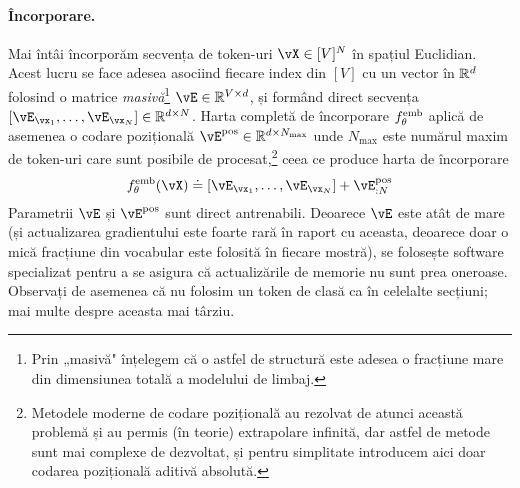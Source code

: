 \documentclass[../../book-main_ro.tex]{subfiles}
\begin{document}
\paragraph{Încorporare.} Mai întâi încorporăm secvența de token-uri \(\vX \in [V]^{N}\) în spațiul Euclidian. Acest lucru se face adesea asociind fiecare index din \([V]\) cu un vector în \(\mathbb{R}^{d}\) folosind o matrice \textit{masivă}\footnote{Prin „masivă" înțelegem că o astfel de structură este adesea o fracțiune mare din dimensiunea totală a modelului de limbaj.} \(\vE \in \R^{V \times d}\), și formând direct secvența \([\vE_{\vx_{1}}, \dots, \vE_{\vx_{N}}] \in \R^{d \times N}\). Harta completă de încorporare \(f_{\theta}^{\mathrm{emb}}\) aplică de asemenea o codare pozițională \(\vE^{\pos} \in \R^{d  \times N_{\max}}\) unde \(N_{\max}\) este numărul maxim de token-uri care sunt posibile de procesat,\footnote{Metodele moderne de codare pozițională au rezolvat de atunci această problemă și au permis (în teorie) extrapolare infinită, dar astfel de metode sunt mai complexe de dezvoltat, și pentru simplitate introducem aici doar codarea pozițională aditivă absolută.} ceea ce produce harta de încorporare
\begin{equation}
    f_{\theta}^{\emb}(\vX) \doteq [\vE_{\vx_{1}}, \dots, \vE_{\vx_{N}}] + \vE_{:N}^{\pos}
\end{equation}
Parametrii \(\vE\) și \(\vE^{\pos}\) sunt direct antrenabili. Deoarece \(\vE\) este atât de mare (și actualizarea gradientului este foarte rară în raport cu aceasta, deoarece doar o mică fracțiune din vocabular este folosită în fiecare mostră), se folosește software specializat pentru a se asigura că actualizările de memorie nu sunt prea oneroase. Observați de asemenea că nu folosim un token de clasă ca în celelalte secțiuni; mai multe despre aceasta mai târziu.
\end{document}
